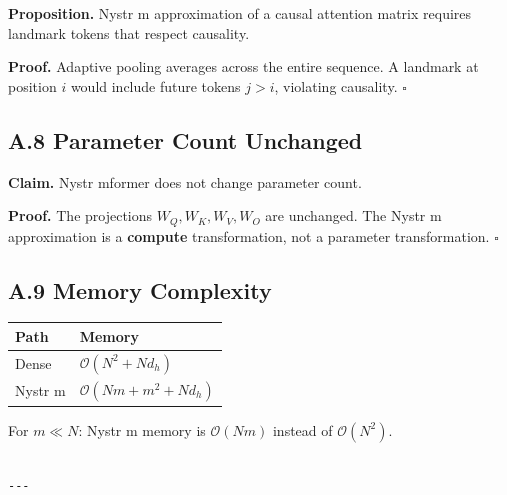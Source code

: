 \textbf{Proposition.} Nystr m approximation of a causal attention matrix 
requires landmark tokens that respect causality.

\textbf{Proof.} Adaptive pooling averages across the entire sequence. A landmark 
at position $i$ would include future tokens $j > i$, violating causality. $\square$

\subsection{A.8 Parameter Count Unchanged}

\textbf{Claim.} Nystr mformer does not change parameter count.

\textbf{Proof.} The projections $W_Q, W_K, W_V, W_O$ are unchanged. The 
Nystr m approximation is a \textbf{compute} transformation, not a parameter 
transformation. $\square$

\subsection{A.9 Memory Complexity}

\begin{table}[H]
\centering
\small
\begin{tabular}{ll}
\toprule
\textbf{Path} & \textbf{Memory} \\
\midrule
Dense & $\mathcal{O}(N^2 + N d_h)$ \\
Nystr m & $\mathcal{O}(N m + m^2 + N d_h)$ \\
\bottomrule
\end{tabular}
\end{table}

For $m \ll N$: Nystr m memory is $\mathcal{O}(N m)$ instead of 
$\mathcal{O}(N^2)$.
\begin{lstlisting}

---
\end{lstlisting}
